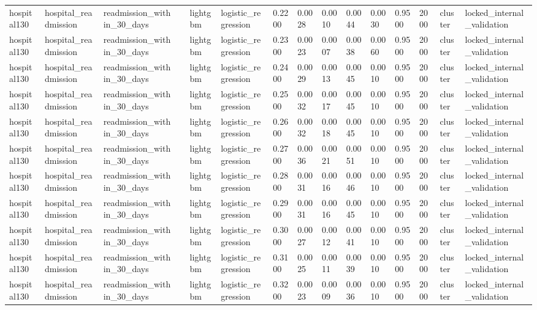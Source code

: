 \begin{tabular}{lllllllllllllll}
hospital130 & hospital\_readmission & readmission\_within\_30\_days &  & lightgbm & logistic\_regression & 0.2200 & 0.0028 & 0.0010 & 0.0044 & 0.0030 & 0.9500 & 2000 & cluster & locked\_internal\_validation \\
hospital130 & hospital\_readmission & readmission\_within\_30\_days &  & lightgbm & logistic\_regression & 0.2300 & 0.0023 & 0.0007 & 0.0038 & 0.0060 & 0.9500 & 2000 & cluster & locked\_internal\_validation \\
hospital130 & hospital\_readmission & readmission\_within\_30\_days &  & lightgbm & logistic\_regression & 0.2400 & 0.0029 & 0.0013 & 0.0045 & 0.0010 & 0.9500 & 2000 & cluster & locked\_internal\_validation \\
hospital130 & hospital\_readmission & readmission\_within\_30\_days &  & lightgbm & logistic\_regression & 0.2500 & 0.0032 & 0.0017 & 0.0045 & 0.0010 & 0.9500 & 2000 & cluster & locked\_internal\_validation \\
hospital130 & hospital\_readmission & readmission\_within\_30\_days &  & lightgbm & logistic\_regression & 0.2600 & 0.0032 & 0.0018 & 0.0045 & 0.0010 & 0.9500 & 2000 & cluster & locked\_internal\_validation \\
hospital130 & hospital\_readmission & readmission\_within\_30\_days &  & lightgbm & logistic\_regression & 0.2700 & 0.0036 & 0.0021 & 0.0051 & 0.0010 & 0.9500 & 2000 & cluster & locked\_internal\_validation \\
hospital130 & hospital\_readmission & readmission\_within\_30\_days &  & lightgbm & logistic\_regression & 0.2800 & 0.0031 & 0.0016 & 0.0046 & 0.0010 & 0.9500 & 2000 & cluster & locked\_internal\_validation \\
hospital130 & hospital\_readmission & readmission\_within\_30\_days &  & lightgbm & logistic\_regression & 0.2900 & 0.0031 & 0.0016 & 0.0045 & 0.0010 & 0.9500 & 2000 & cluster & locked\_internal\_validation \\
hospital130 & hospital\_readmission & readmission\_within\_30\_days &  & lightgbm & logistic\_regression & 0.3000 & 0.0027 & 0.0012 & 0.0041 & 0.0010 & 0.9500 & 2000 & cluster & locked\_internal\_validation \\
hospital130 & hospital\_readmission & readmission\_within\_30\_days &  & lightgbm & logistic\_regression & 0.3100 & 0.0025 & 0.0011 & 0.0039 & 0.0010 & 0.9500 & 2000 & cluster & locked\_internal\_validation \\
hospital130 & hospital\_readmission & readmission\_within\_30\_days &  & lightgbm & logistic\_regression & 0.3200 & 0.0023 & 0.0009 & 0.0036 & 0.0010 & 0.9500 & 2000 & cluster & locked\_internal\_validation \\

\end{tabular}
